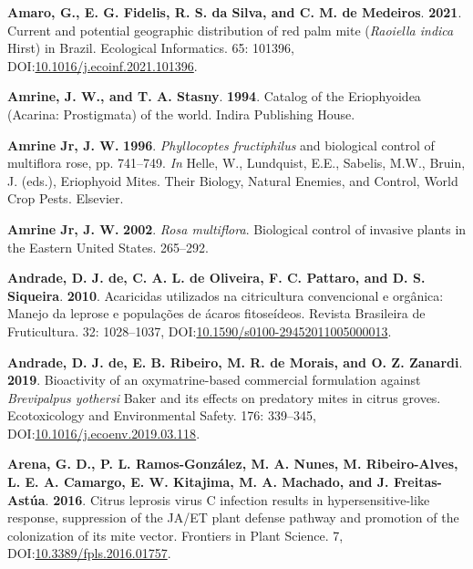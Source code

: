 \documentclass[12pt,final,CPage]{ufthesis}
\newlength{\cslhangindent}
\newenvironment{CSLReferences}[2] %
{%
	\setlength{\parindent}{0pt}
	\ifodd #1 \everypar{\setlength{\hangindent}{\cslhangindent}}\ignorespaces\fi
	\ifnum #2 > 0
	\setlength{\parskip}{#2\baselineskip}
	\fi
}%
{}
\begin{document}
{\begin{CSLReferences}{1}{0}
  \leavevmode{}%
  \textbf{Amaro, G., E. G. Fidelis, R. S. da Silva, and C. M. de Medeiros}. \textbf{2021}. Current and potential geographic distribution of red palm mite ({\emph{Raoiella indica}} {Hirst}) in {Brazil}. Ecological Informatics. 65: 101396, DOI:\href{https://doi.org/10.1016/j.ecoinf.2021.101396}{10.1016/j.ecoinf.2021.101396}.

  \leavevmode{}%
  \textbf{Amrine, J. W., and T. A. Stasny}. \textbf{1994}. Catalog of the {Eriophyoidea} ({Acarina}: {Prostigmata}) of the world. Indira Publishing House.

  \leavevmode{}%
  \textbf{Amrine Jr, J. W.} \textbf{1996}. {\emph{Phyllocoptes fructiphilus}} and biological control of multiflora rose, pp. 741--749. \emph{In} Helle, W., Lundquist, E.E., Sabelis, M.W., Bruin, J. (eds.), Eriophyoid Mites. Their Biology, Natural Enemies, and Control, World Crop Pests. Elsevier.

  \leavevmode{}%
  \textbf{Amrine Jr, J. W.} \textbf{2002}. {\emph{Rosa multiflora}}. Biological control of invasive plants in the Eastern {United States}. 265--292.

  \leavevmode{}%
  \textbf{Andrade, D. J. de, C. A. L. de Oliveira, F. C. Pattaro, and D. S. Siqueira}. \textbf{2010}. Acaricidas utilizados na citricultura convencional e org{â}nica: Manejo da leprose e popula{ç}{õ}es de {á}caros fitose{í}deos. Revista Brasileira de Fruticultura. 32: 1028--1037, DOI:\href{https://doi.org/10.1590/s0100-29452011005000013}{10.1590/s0100-29452011005000013}.

  \leavevmode{}%
  \textbf{Andrade, D. J. de, E. B. Ribeiro, M. R. de Morais, and O. Z. Zanardi}. \textbf{2019}. Bioactivity of an oxymatrine-based commercial formulation against {\emph{Brevipalpus yothersi}} {Baker} and its effects on predatory mites in citrus groves. Ecotoxicology and Environmental Safety. 176: 339--345, DOI:\href{https://doi.org/10.1016/j.ecoenv.2019.03.118}{10.1016/j.ecoenv.2019.03.118}.

  \leavevmode{}%
  \textbf{Arena, G. D., P. L. Ramos-González, M. A. Nunes, M. Ribeiro-Alves, L. E. A. Camargo, E. W. Kitajima, M. A. Machado, and J. Freitas-Astúa}. \textbf{2016}. {Citrus leprosis virus} {C} infection results in hypersensitive-like response, suppression of the {JA}/{ET} plant defense pathway and promotion of the colonization of its mite vector. Frontiers in Plant Science. 7, DOI:\href{https://doi.org/10.3389/fpls.2016.01757}{10.3389/fpls.2016.01757}.


\end{CSLReferences}}
\end{document}
